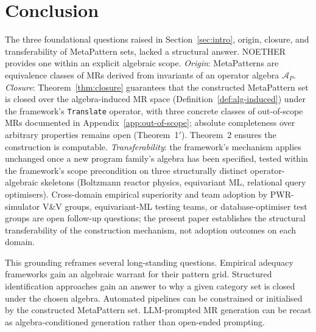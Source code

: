 \documentclass[acmsmall, screen]{acmart}
\begin{document}
\section{Conclusion}
\label{sec:conclusion}

The three foundational questions raised in Section~\ref{sec:intro}, origin, closure, and transferability of MetaPattern sets, lacked a structural answer. NOETHER provides one within an explicit algebraic scope. \emph{Origin}: MetaPatterns are equivalence classes of MRs derived from invariants of an operator algebra $\mathcal{A}_P$. \emph{Closure}: Theorem~\ref{thm:closure} guarantees that the constructed MetaPattern set is closed over the algebra-induced MR space (Definition~\ref{def:alg-induced}) under the framework's \texttt{Translate} operator, with three concrete classes of out-of-scope MRs documented in Appendix~\ref{app:out-of-scope}; absolute completeness over arbitrary properties remains open (Theorem~1$'$). Theorem~2 ensures the construction is computable. \emph{Transferability}: the framework's mechanism applies unchanged once a new program family's algebra has been specified, tested within the framework's scope precondition on three structurally distinct operator-algebraic skeletons (Boltzmann reactor physics, equivariant ML, relational query optimisers). Cross-domain empirical superiority and team adoption by PWR-simulator V\&V groups, equivariant-ML testing teams, or database-optimiser test groups are open follow-up questions; the present paper establishes the structural transferability of the construction mechanism, not adoption outcomes on each domain.

This grounding reframes several long-standing questions. Empirical adequacy frameworks gain an algebraic warrant for their pattern grid. Structured identification approaches gain an answer to why a given category set is closed under the chosen algebra. Automated pipelines can be constrained or initialised by the constructed MetaPattern set. LLM-prompted MR generation can be recast as algebra-conditioned generation rather than open-ended prompting.
\end{document}
